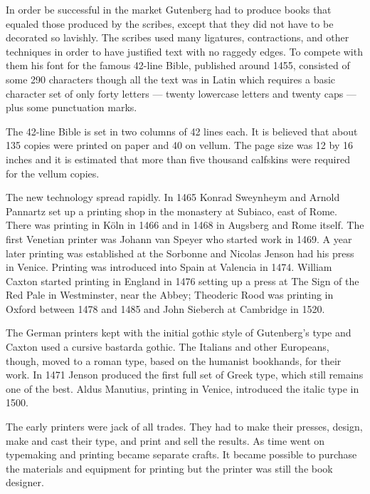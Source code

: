 \documentclass[10pt,a4paper,extrafontsizes]{memoir}
\begin{document}
\begin{paracol}{2}
    In order be successful in the market Gutenberg had to produce books
that equaled those produced by the scribes, except that they did not
have to be decorated so lavishly. The scribes used many ligatures,
contractions, and other techniques in order to have justified text with
no raggedy edges. To compete with them his font for the famous 42-line 
Bible, published around 1455, consisted of some 290 characters though all
the text was in Latin which requires a basic character set of only forty 
letters --- twenty lowercase letters and twenty caps --- plus
some punctuation marks.

    The 42-line Bible is set in two columns of 42 lines each. It is believed
that about 135 copies were printed on paper and 40 on vellum. The page size was
12 by 16 inches and it is estimated that more than five 
thousand calfskins were required for the vellum copies.

    The new technology spread rapidly. In 1465 
Konrad Sweynheym and Arnold
Pannartz set up a printing shop in the monastery at Subiaco, east of Rome.
There was printing in K\"{o}ln in 1466 and in 1468 in Augsberg and Rome itself.
The first Venetian printer was Johann van Speyer 
who started work in 1469. A year later printing was established at the 
Sorbonne and Nicolas Jenson
had his press in Venice. Printing was introduced into Spain at Valencia 
in 1474. William Caxton started printing in England 
in 1476 setting up a press at The Sign of the Red Pale in Westminster, 
near the Abbey; Theoderic Rood was printing in 
Oxford between 1478 and 1485 and John Sieberch at 
Cambridge in 1520.

    The German printers kept with the initial gothic
style of Gutenberg's type and Caxton used a cursive bastarda gothic. The
Italians and other Europeans, though, moved to a roman type, based on the
humanist bookhands, for their
work. In 1471 Jenson produced the first full set of Greek type, which still
remains one of the best. Aldus Manutius, printing in 
Venice, introduced the italic type in 1500.

   The early printers were jack of all trades. They had to make their presses,
design, make and cast their type, 
and print and sell the results. As time went
on typemaking and printing became separate crafts. It became possible to 
purchase the materials and equipment for printing but the printer was still
the book designer.


\end{paracol}
\end{document}
